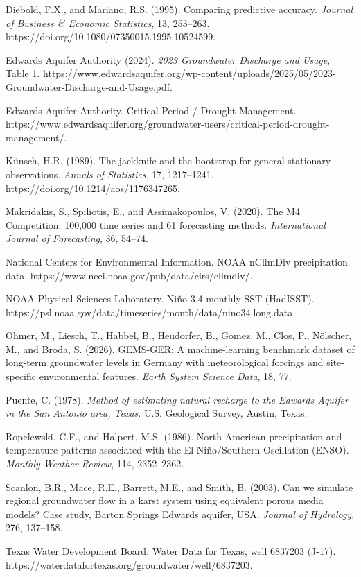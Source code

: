 \documentclass[11pt]{article}
\begin{document}
Diebold, F.X., and Mariano, R.S. (1995). Comparing predictive accuracy. \emph{Journal of Business \& Economic Statistics}, 13, 253--263. https://doi.org/10.1080/07350015.1995.10524599.

Edwards Aquifer Authority (2024). \emph{2023 Groundwater Discharge and Usage}, Table 1. https://www.edwardsaquifer.org/wp-content/uploads/2025/05/2023-Groundwater-Discharge-and-Usage.pdf.

Edwards Aquifer Authority. Critical Period / Drought Management. https://www.edwardsaquifer.org/groundwater-users/critical-period-drought-management/.

Künsch, H.R. (1989). The jackknife and the bootstrap for general stationary observations. \emph{Annals of Statistics}, 17, 1217--1241. https://doi.org/10.1214/aos/1176347265.

Makridakis, S., Spiliotis, E., and Assimakopoulos, V. (2020). The M4 Competition: 100,000 time series and 61 forecasting methods. \emph{International Journal of Forecasting}, 36, 54--74.

National Centers for Environmental Information. NOAA nClimDiv precipitation data. https://www.ncei.noaa.gov/pub/data/cirs/climdiv/.

NOAA Physical Sciences Laboratory. Niño 3.4 monthly SST (HadISST). https://psl.noaa.gov/data/timeseries/month/data/nino34.long.data.

Ohmer, M., Liesch, T., Habbel, B., Heudorfer, B., Gomez, M., Clos, P., Nölscher, M., and Broda, S. (2026). GEMS-GER: A machine-learning benchmark dataset of long-term groundwater levels in Germany with meteorological forcings and site-specific environmental features. \emph{Earth System Science Data}, 18, 77.

Puente, C. (1978). \emph{Method of estimating natural recharge to the Edwards Aquifer in the San Antonio area, Texas}. U.S. Geological Survey, Austin, Texas.

Ropelewski, C.F., and Halpert, M.S. (1986). North American precipitation and temperature patterns associated with the El Niño/Southern Oscillation (ENSO). \emph{Monthly Weather Review}, 114, 2352--2362.

Scanlon, B.R., Mace, R.E., Barrett, M.E., and Smith, B. (2003). Can we simulate regional groundwater flow in a karst system using equivalent porous media models? Case study, Barton Springs Edwards aquifer, USA. \emph{Journal of Hydrology}, 276, 137--158.

Texas Water Development Board. Water Data for Texas, well 6837203 (J-17). https://waterdatafortexas.org/groundwater/well/6837203.
\end{document}
